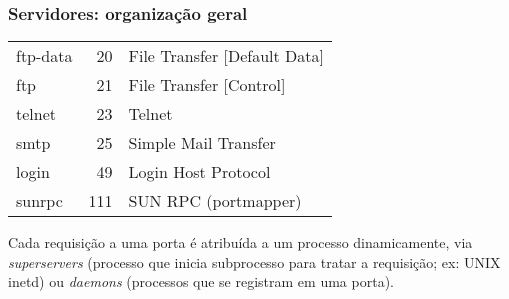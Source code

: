 \documentclass[Ligatures=TeX,table,brazil,svgnames,usetotalslideindicator,compress,10pt]{beamer}
\begin{document}
\begin{frame}
  \frametitle{Servidores: organização geral}

  {\small
    \begin{center}
      \renewcommand{\arraystretch}{1.2}
      \begin{tabular}{|lrl|}\hline
        ftp-data    &     20 &    File Transfer [Default Data]				\\
        ftp         &     21 &    File Transfer [Control]					\\
        telnet      &     23 &    Telnet									\\
        smtp        &     25 &    Simple Mail Transfer						\\
        login       &     49 &    Login Host Protocol						\\
        sunrpc      &    111 &    SUN RPC (portmapper)						\\   \hline
      \end{tabular}
    \end{center}}

  \begin{block}{}
    Cada requisição a uma porta é atribuída a um processo dinamicamente,
    via \emph{superservers} (processo que inicia subprocesso para tratar
    a requisição; ex: UNIX inetd) ou \emph{daemons} (processos que se
    registram em uma porta).
  \end{block}

\end{frame}
\end{document}
